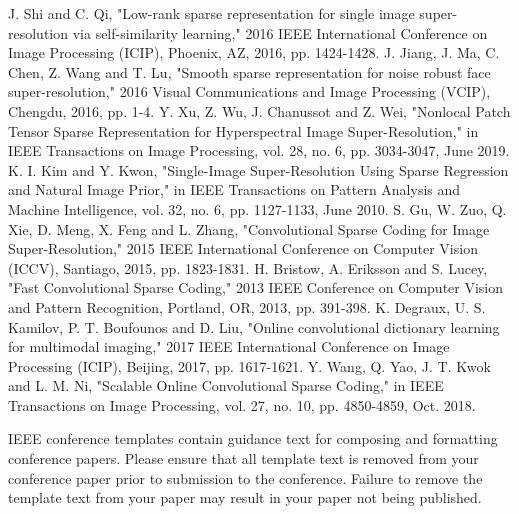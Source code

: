 \documentclass[conference]{IEEEtran}
\begin{document}
\begin{thebibliography}{00}
 J. Shi and C. Qi, "Low-rank sparse representation for single image super-resolution via self-similarity learning," 2016 IEEE International Conference on Image Processing (ICIP), Phoenix, AZ, 2016, pp. 1424-1428.
 J. Jiang, J. Ma, C. Chen, Z. Wang and T. Lu, "Smooth sparse representation for noise robust face super-resolution," 2016 Visual Communications and Image Processing (VCIP), Chengdu, 2016, pp. 1-4.
 Y. Xu, Z. Wu, J. Chanussot and Z. Wei, "Nonlocal Patch Tensor Sparse Representation for Hyperspectral Image Super-Resolution," in IEEE Transactions on Image Processing, vol. 28, no. 6, pp. 3034-3047, June 2019.
K. I. Kim and Y. Kwon, "Single-Image Super-Resolution Using Sparse Regression and Natural Image Prior," in IEEE Transactions on Pattern Analysis and Machine Intelligence, vol. 32, no. 6, pp. 1127-1133, June 2010.
 S. Gu, W. Zuo, Q. Xie, D. Meng, X. Feng and L. Zhang, "Convolutional Sparse Coding for Image Super-Resolution," 2015 IEEE International Conference on Computer Vision (ICCV), Santiago, 2015, pp. 1823-1831.
 H. Bristow, A. Eriksson and S. Lucey, "Fast Convolutional Sparse Coding," 2013 IEEE Conference on Computer Vision and Pattern Recognition, Portland, OR, 2013, pp. 391-398.
 K. Degraux, U. S. Kamilov, P. T. Boufounos and D. Liu, "Online convolutional dictionary learning for multimodal imaging," 2017 IEEE International Conference on Image Processing (ICIP), Beijing, 2017, pp. 1617-1621.
 Y. Wang, Q. Yao, J. T. Kwok and L. M. Ni, "Scalable Online Convolutional Sparse Coding," in IEEE Transactions on Image Processing, vol. 27, no. 10, pp. 4850-4859, Oct. 2018.

\end{thebibliography}
\vspace{12pt}
\color{red}
IEEE conference templates contain guidance text for composing and formatting conference papers. Please ensure that all template text is removed from your conference paper prior to submission to the conference. Failure to remove the template text from your paper may result in your paper not being published.
\end{document}
